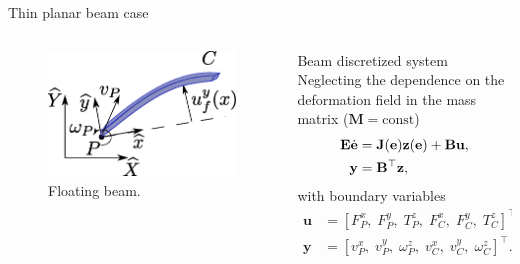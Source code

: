 \documentclass[aspectratio=169]{ISAE-Beamer}
\begin{document}
\begin{frame}{Thin planar beam case}
\begin{columns}[T]
	\begin{column}{0.5\columnwidth}
		\begin{tcolorbox}
			\begin{figure}
				\centering
				\includegraphics[width=0.98\columnwidth]{part_4/pHfmd/beam.eps} 
				\caption{Floating beam.}
				\label{fig:beam}
			\end{figure}
		\end{tcolorbox}
	\end{column}
	\begin{column}{0.5\textwidth}
		\begin{block}{Beam discretized system}
			Neglecting the dependence on the deformation field in the mass matrix ($\mathbf{M}=\text{const}$)
			\begin{equation*}
			\begin{aligned}
			\mathbf{E} \dot{\mathbf{e}} &= \mathbf{J}(\mathbf{e}) \mathbf{z}(\mathbf{e}) + \mathbf{B} \mathbf{u}, \vspace{2mm} \\
			\mathbf{y} &= \mathbf{B}^{\top}  \mathbf{z}, \\
			\end{aligned}
			\end{equation*}
			with boundary variables
			\begin{equation*}
			\begin{aligned}
			\mathbf{u} &=  [F_{P}^x, \; F_{P}^y, \; T_{P}^z, \; F_{C}^x, \; F_{C}^y, \; T_{C}^z]^\top, \\
			\mathbf{y} &=  [v_{P}^x, \; v_{P}^y, \; \omega_{P}^z, \; v_{C}^x, \; v_{C}^y, \; \omega_{C}^z]^\top.
			\end{aligned}
			\end{equation*}
		\end{block}	
	\end{column}
\end{columns}

\end{frame}
\end{document}
